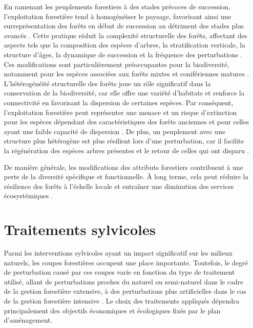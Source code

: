 En ramenant les peuplements forestiers à des stades précoces de succession, l'exploitation forestière tend à homogénéiser le paysage, favorisant ainsi une surreprésentation des forêts en début de succession 
au détriment des stades plus avancés \citep{Cyr2009Forestmanagement,Boucher2017Cumulativepatterns}. 
Cette pratique réduit la complexité structurelle des forêts, affectant des aspects tels que la composition des espèces d'arbres, la stratification verticale, la structure d'âges, 
la dynamique de succession et la fréquence des perturbations \citep{Commarmot2005Structurevirgin}. 
Ces modifications sont particulièrement préoccupantes pour la biodiversité, notamment pour les espèces associées aux forêts mixtes et conifériennes matures \citep{Tremblay2018Harvestinginteracts,Cadieux2020Projectedeffects}.
L'hétérogénéité structurelle des forêts joue un rôle significatif dans la conservation de la biodiversité, car elle offre une variété d'habitats et renforce la connectivité en favorisant la dispersion de certaines espèces. 
Par conséquent, l'exploitation forestière peut représenter une menace et un risque d'extinction pour les espèces dépendant des caractéristiques des forêts anciennes et pour celles ayant une faible capacité de dispersion \citep{Norden2001Conceptualproblems,Martin2021indicatorspecies}. 
De plus, un peuplement avec une structure plus hétérogène est plus résilient lors d'une perturbation, car il facilite la régénération des espèces arbres présentes et le retour de celles qui ont disparu \citep{Kuuluvainen2009Forestmanagement}. 

De manière générale, les modifications des attributs forestiers contribuent à une perte de la diversité spécifique et fonctionnelle. 
À long terme, cela peut réduire la résilience des forêts à l'échelle locale et entraîner une diminution des services écosystémiques \citep{Hooper2012globalsynthesis,Edwards2014Maintainingecosystem}. 

\section*{Traitements sylvicoles}
\label{sec:sylvicole}

Parmi les interventions sylvicoles ayant un impact significatif sur les milieux naturels, les coupes forestières occupent une place importante. 
Toutefois, le degré de perturbation causé par ces coupes varie en fonction du type de traitement utilisé, allant de perturbations proches du naturel ou semi-naturel dans le cadre de la gestion forestière extensive, à des perturbations plus artificielles dans le cas de la gestion forestière intensive \citep{Ameray2021Forestcarbon}. 
Le choix des traitements appliqués dépendra principalement des objectifs économiques et écologiques fixés par le plan d'aménagement.

